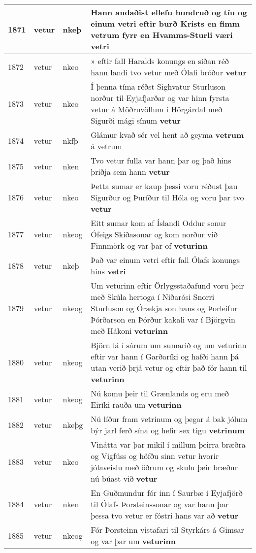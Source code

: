 \documentclass{article}
\begin{document}
\begin{longtable}{p{1cm}|p{1cm}|p{1cm}|p{13cm}}
\hline
1871&vetur&nkeþ&Hann andaðist ellefu hundruð og tíu og einum vetri eftir burð Krists en fimm vetrum fyrr en Hvamms-Sturli væri \textbf{vetri} \\
\hline
1872&vetur&nkeo&» eftir fall Haralds konungs en síðan réð hann landi tvo vetur með Ólafi bróður \textbf{vetur} \\
\hline
1873&vetur&nkeo&Í þenna tíma réðst Sighvatur Sturluson norður til Eyjafjarðar og var hinn fyrsta vetur á Möðruvöllum í Hörgárdal með Sigurði mági sínum \textbf{vetur} \\
\hline
1874&vetur&nkfþ&Glámur kvað sér vel hent að geyma \textbf{vetrum} á vetrum\\
\hline
1875&vetur&nken&Tvo vetur fulla var hann þar og það hins þriðja sem hann \textbf{vetur} \\
\hline
1876&vetur&nkeo&Þetta sumar er kaup þessi voru réðust þau Sigurður og Þuríður til Hóla og voru þar tvo \textbf{vetur} \\
\hline
1877&vetur&nkeog&Eitt sumar kom af Íslandi Oddur sonur Ófeigs Skíðasonar og kom norður við Finnmörk og var þar of \textbf{veturinn} \\
\hline
1878&vetur&nkeþ&Það var einum vetri eftir fall Ólafs konungs hins \textbf{vetri} \\
\hline
1879&vetur&nkeog&Um veturinn eftir Örlygsstaðafund voru þeir með Skúla hertoga í Niðarósi Snorri Sturluson og Órækja son hans og Þorleifur Þórðarson en Þórður kakali var í Björgvin með Hákoni \textbf{veturinn} \\
\hline
1880&vetur&nkeog&Björn lá í sárum um sumarið og um veturinn eftir var hann í Garðaríki og hafði hann þá utan verið þrjá vetur og eftir það fór hann til \textbf{veturinn} \\
\hline
1881&vetur&nkeog&Nú komu þeir til Grænlands og eru með Eiríki rauða um \textbf{veturinn} \\
\hline
1882&vetur&nkeþg&Nú líður fram vetrinum og þegar á bak jólum býr jarl ferð sína og hefir sex tigu \textbf{vetrinum} \\
\hline
1883&vetur&nkeo&Vinátta var þar mikil í millum þeirra bræðra og Vigfúss og höfðu sinn vetur hvorir jólaveislu með öðrum og skulu þeir bræður nú búast við \textbf{vetur} \\
\hline
1884&vetur&nken&En Guðmundur fór inn í Saurbæ í Eyjafjörð til Ólafs Þorsteinssonar og var hann þar þessa tvo vetur er fóstri hans var að \textbf{vetur} \\
\hline
1885&vetur&nkeog&Fór Þorsteinn vistafari til Styrkárs á Gimsar og var þar um \textbf{veturinn} \\

\end{longtable}
\end{document}
